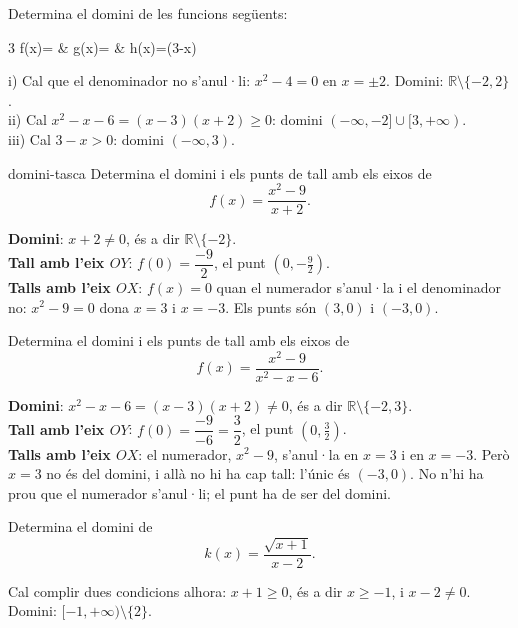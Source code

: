 \begin{apartats}

Determina el domini de les funcions següents:
\begin{graella}{3}
  \sa f(x)= & \sa g(x)= & \sa h(x)=\ln(3-x)
\end{graella}

\begin{solucio}
i) Cal que el denominador no s'anul·li: $x^2-4=0$ en $x=\pm2$. Domini:
$\mathbb{R}\setminus\{-2,2\}$.\\
ii) Cal $x^2-x-6=(x-3)(x+2)\ge0$: domini $(-\infty,-2]\cup[3,+\infty)$.\\
iii) Cal $3-x>0$: domini $(-\infty,3)$.
\end{solucio}

\begin{tria}{domini-tasca}
Determina el domini i els punts de tall amb els eixos de
\[
f(x)=\frac{x^2-9}{x+2} .
\]

\begin{solucio}
\textbf{Domini}: $x+2\neq0$, és a dir $\mathbb{R}\setminus\{-2\}$.\\
\textbf{Tall amb l'eix $OY$}: $f(0)=\dfrac{-9}{2}$, el punt $\left(0,-\tfrac92\right)$.\\
\textbf{Talls amb l'eix $OX$}: $f(x)=0$ quan el numerador s'anul·la i el denominador no:
$x^2-9=0$ dona $x=3$ i $x=-3$. Els punts són $(3,0)$ i $(-3,0)$.
\end{solucio}

Determina el domini i els punts de tall amb els eixos de
\[
f(x)=\frac{x^2-9}{x^2-x-6} .
\]

\begin{solucio}
\textbf{Domini}: $x^2-x-6=(x-3)(x+2)\neq0$, és a dir $\mathbb{R}\setminus\{-2,3\}$.\\
\textbf{Tall amb l'eix $OY$}: $f(0)=\dfrac{-9}{-6}=\dfrac32$, el punt $\left(0,\tfrac32\right)$.\\
\textbf{Talls amb l'eix $OX$}: el numerador, $x^2-9$, s'anul·la en $x=3$ i en $x=-3$. Però $x=3$ no és
del domini, i allà no hi ha cap tall: l'únic és $(-3,0)$. No n'hi ha prou que el numerador s'anul·li;
el punt ha de ser del domini.
\end{solucio}
\end{tria}

\begin{nomesllarg}
Determina el domini de
\[
k(x)=\frac{\sqrt{x+1}}{x-2} .
\]

\begin{solucio}
Cal complir dues condicions alhora: $x+1\ge0$, és a dir $x\ge-1$, i $x-2\neq0$.\\
Domini: $[-1,+\infty)\setminus\{2\}$.
\end{solucio}
\end{nomesllarg}

\end{apartats}

